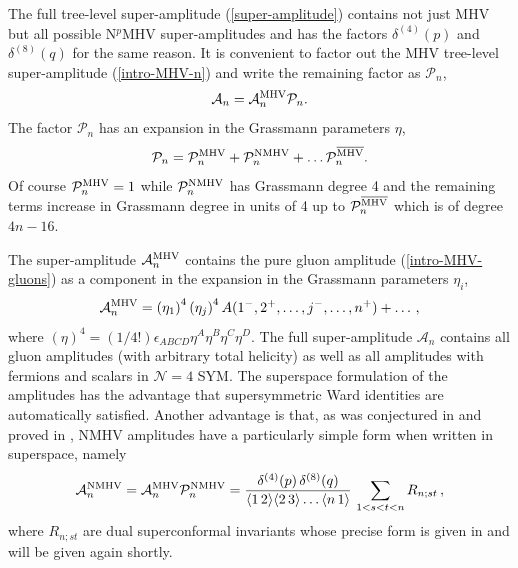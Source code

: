 \documentclass[12pt]{article}
\def \be  {\begin{equation}}
\def \ee  {\end{equation}}
\newcommand \vev [1] {\langle{#1}\rangle}
\def\bMHV{\overline{\rm MHV}}
\begin{document}
The full tree-level super-amplitude (\ref{super-amplitude}) contains not just MHV but all possible N${}^p$MHV super-amplitudes and has the factors $\delta^{(4)}(p)$ and $\delta^{(8)}(q)$ for the same reason. It is convenient to factor out the MHV tree-level super-amplitude (\ref{intro-MHV-n}) and write the remaining factor as $\mathcal{P}_n$,
\be
\label{def-curlyP}
\mathcal{A}_n = \mathcal{A}_n^{\rm MHV} \mathcal{P}_n.
\ee
The factor $\mathcal{P}_n$ has an expansion in the Grassmann parameters $\eta$,
\be
\mathcal{P}_n = \mathcal{P}_n^{\rm MHV} + \mathcal{P}_n^{\rm NMHV} + \ldots \mathcal{P}_n^{\bMHV}.
\ee
Of course $\mathcal{P}_n^{\rm MHV} =1$ while $\mathcal{P}_n^{\rm NMHV}$ has Grassmann degree 4 and the remaining terms increase in Grassmann degree in units of 4 up to $\mathcal{P}_n^{\bMHV}$ which is of degree $4n-16$.

The super-amplitude ${\cal A}^{\rm MHV}_{n}$
contains the pure gluon amplitude (\ref{intro-MHV-gluons}) as a
component in the expansion in the Grassmann parameters $\eta_{i}$,
\be \label{intro-expansion} {\cal A}^{\rm MHV}_{n} =
\left(\eta_1\right)^4 \left(\eta_j\right)^4
A(1^{-},2^{+},\ldots,j^{-},\ldots,n^{+}) + \ldots\,, \ee where
$(\eta)^4 = (1/4!) \epsilon_{ABCD} \eta^A \eta^B \eta^C \eta^D$.
The full super-amplitude $\mathcal{A}_n$ contains all gluon amplitudes (with arbitrary total helicity) as well as all amplitudes with fermions and scalars in $\mathcal{N}=4$ SYM.
The
superspace formulation of the amplitudes has the advantage that
supersymmetric Ward identities are automatically satisfied.
Another advantage is that, as was conjectured in \cite{dhks5} and
proved in \cite{dhks6}, NMHV amplitudes have a particularly simple
form when written in superspace, namely
\be\label{intro-NMHV}
 {\cal A}^{\rm {NMHV}}_{n} = \mathcal{A}_n^{\rm MHV} \mathcal{P}_n^{\rm NMHV} =\frac{ \delta^{(4)}(p) \, \delta^{(8)}(q)}{\vev{1\, 2}\vev{2\, 3}\ldots\vev{n\, 1}} \, \sum_{1<s<t<n} R_{n;st} \,,
\ee
where $R_{n;st}$ are dual superconformal invariants
whose precise form is given in \cite{dhks5} and will be given again shortly.
\end{document}
